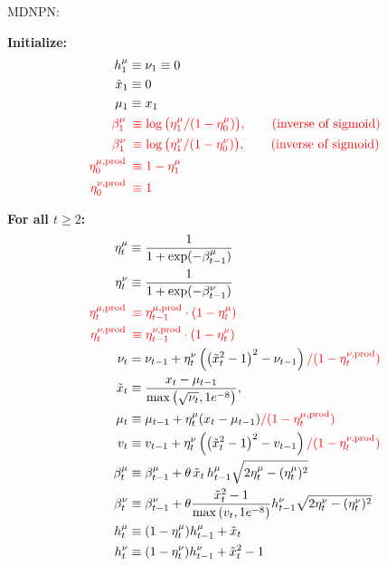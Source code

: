 \documentclass{article}
\newcommand{\red}[1]{\textcolor{red}{#1}}
\begin{document}
	{\large MDNPN:}
	
	\medskip
	
	
	
	\textbf{Initialize:}
	\begin{align*}
		h_1^\mu &\equiv  \nu_1  \equiv0 \\
		\tilde{x}_1 & \equiv 0 \\
		\mu_1 &\equiv x_1\\
		\red{\beta_1^\mu} \,&\,\,  \red{ \equiv \log\big(\eta_1^\mu/(1-\eta_0^\mu)\big) , \qquad\textrm{(inverse of sigmoid)}} \\
		\red{\beta_1^\nu} \,&\,\,  \red{\equiv \log\big(\eta_1^\nu/(1-\eta_0^\nu)\big) , \qquad \textrm{(inverse of sigmoid)}} \\
		\red{\eta^{\mu, \mathrm{prod}}_0} \,&\,\,\red{ \equiv 1-\eta^\mu_1}\\
		\red{\eta^{\nu, \mathrm{prod}}_0} \,&\,\,\red{ \equiv 1}
	\end{align*}
	
	\textbf{For all $t \geq 2$:}
	\begin{align}
		\eta_t^\mu  &\equiv \frac{1}{1 + \exp(-\beta_{t-1}^\mu)} \\
		\eta_t^\nu  &\equiv \frac{1}{1 + \exp(-\beta_{t-1}^\nu)} \\
		\red{\eta^{\mu, \mathrm{prod}}_t} \,&\,\,\red{\equiv \eta^{\mu, \mathrm{prod}}_{t-1} \cdot (1 - \eta_{t}^\mu)} \\
		\red{\eta^{\nu, \mathrm{prod}}_t} \,&\,\,\red{\equiv \eta^{\nu, \mathrm{prod}}_{t-1} \cdot (1 - \eta_{t}^\nu)} \\
		\nu_t &= \nu_{t-1} + \eta_{t}^\nu \left( \left( \tilde{x}_t^2 - 1 \right)^2 - \nu_{t-1} \right) \red{ / (1 - \eta^{\nu, \mathrm{prod}}_t)}\\
		\tilde{x}_t &\equiv \frac{x_t -\mu_{t-1}}{\max\left( \sqrt{\nu_t}, 1e^{-8} \right)}, \\
		\mu_t &\equiv \mu_{t-1} + \eta_{t}^\mu (x_t - \mu_{t-1}) \red{/(1 - \eta^{\mu, \mathrm{prod}}_{t})} \\
		v_t &\equiv v_{t-1} + \eta_t^ \nu \left(\left(\tilde{x}_t^2-1\right)^2 - v_{t-1}\right) \red{ / (1 - \eta^{\nu, \mathrm{prod}}_t)}  \\
		\beta_t^\mu &\equiv \beta_{t-1}^\mu + \theta\, \tilde{x}_t\, h_{t-1}^\mu \sqrt{2 \eta_{t}^\mu - (\eta_{t}^\mu)^2} \\
		\beta_t^\nu &\equiv \beta_{t-1}^\nu + \theta \frac{\tilde{x}_t^2 - 1}{\max\left( v_t , 1e^{-8} \right)} h_{t-1}^\nu \sqrt{2 \eta_{t}^\nu - (\eta_{t}^\nu)^2} \\
		h_t^\mu &\equiv (1 - \eta_{t}^\mu) h_{t-1}^\mu + \tilde{x}_t \\
		h_t^\nu &\equiv (1 - \eta_{t}^\nu) h_{t-1}^\nu + \tilde{x}_t^2 -1
	\end{align}
	
	
	
	
	
	
\end{document}
